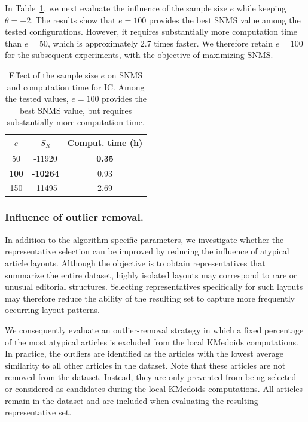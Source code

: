 \documentclass{ieeeaccess}
\newcommand{\toblack}{\color{black}}
\newcommand{\tored}{\color{red}}
\newcommand{\pk}[1]{{\tored [{\bfseries Pierre}: {\itshape #1}] \toblack}}
\newcommand{\threshold}{\theta}
\newcommand{\samplesize}{e}
\newcommand{\kmedoidsalg}{KMedoids\xspace}
\newcommand{\inclusion}{IC\xspace}
\begin{document}

In Table~\ref{tab:e-sample-size}, we next evaluate the influence of the sample size $\samplesize$ while keeping $\threshold=-2$. The results show that $\samplesize=100$ provides the best SNMS value among the tested configurations. However, it requires substantially more computation time than $\samplesize=50$, which is approximately 2.7 times faster. We therefore retain $\samplesize=100$ for the subsequent experiments, with the objective of maximizing SNMS. 


\begin{table}[htbp]
    \centering \normalsize
    \begin{tabular}{ |c|c|c| } 
     \hline
      $\samplesize$ & $S_R$ &
     {Comput. time (h)} \\
     \hline
     50 & -11920 & \textbf{0.35} \\ 
     \textbf{100} & \textbf{-10264} & 0.93 \\ 
     150 & -11495 & 2.69 \\ 
     \hline
    \end{tabular}
\caption{\label{tab:e-sample-size}Effect of the sample size $\samplesize$ on SNMS and computation time for \inclusion. Among the tested values, $\samplesize=100$ provides the best SNMS value, but requires substantially more computation time.}
\end{table}


\subsubsection{Influence of outlier removal.}
\label{sec:outlier-removal}

In addition to the algorithm-specific parameters, we investigate whether the representative selection can be improved by reducing the influence of atypical article layouts. Although the objective is to obtain representatives that summarize the entire dataset, highly isolated layouts may correspond to rare or unusual editorial structures. Selecting representatives specifically for such layouts may therefore reduce the ability of the resulting set to capture more frequently occurring layout patterns.

We consequently evaluate an outlier-removal strategy in which a fixed percentage of the most atypical articles is excluded from the local \kmedoidsalg computations. In practice, the outliers are identified as the articles with the lowest average similarity to all other articles in the dataset.
Note that these articles are not removed from the dataset. Instead, they are only prevented from being selected or considered as candidates during the local \kmedoidsalg computations. All articles remain in the dataset and are included when evaluating the resulting representative set.  
\end{document}
